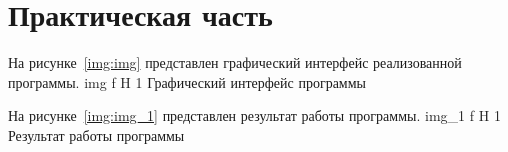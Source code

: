 \chapter{Практическая часть}

На рисунке~\ref{img:img} представлен графический интерфейс реализованной программы.
	{img}
	{f}
	{H}
	{1\textwidth}
	{Графический интерфейс программы}

На рисунке~\ref{img:img_1} представлен результат работы программы.
	{img_1}
	{f}
	{H}
	{1\textwidth}
	{Результат работы программы}
